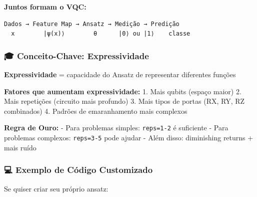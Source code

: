 \documentclass[
  brazilian,
]{report}
\begin{document}
\textbf{Juntos formam o VQC:}

\begin{verbatim}
Dados → Feature Map → Ansatz → Medição → Predição
  x        |ψ(x)⟩        θ      |0⟩ ou |1⟩    classe
\end{verbatim}

\subsubsection{🎓 Conceito-Chave:
Expressividade}\label{conceito-chave-expressividade}

\textbf{Expressividade} = capacidade do Ansatz de representar diferentes
funções

\textbf{Fatores que aumentam expressividade:} 1. Mais qubits (espaço
maior) 2. Mais repetições (circuito mais profundo) 3. Mais tipos de
portas (RX, RY, RZ combinados) 4. Padrões de emaranhamento mais
complexos

\textbf{Regra de Ouro:} - Para problemas simples: \texttt{reps=1-2} é
suficiente - Para problemas complexos: \texttt{reps=3-5} pode ajudar -
Além disso: diminishing returns + mais ruído

\subsubsection{💻 Exemplo de Código
Customizado}\label{exemplo-de-cuxf3digo-customizado}

Se quiser criar seu próprio ansatz:
\end{document}
